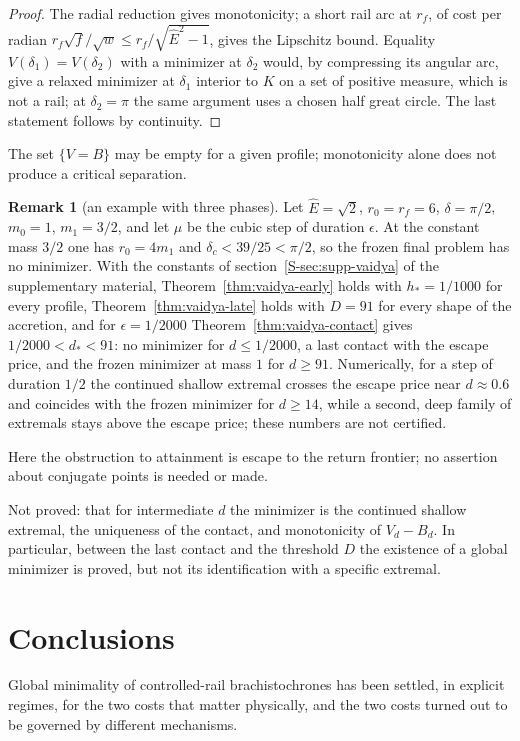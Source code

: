 \documentclass[aip,jmp,amsmath,amssymb,reprint]{revtex4-2}
\newcommand{\Ehat}{\hat E}
\theoremstyle{plain}
\theoremstyle{definition}
\newtheorem{remark}[proposition]{Remark}
\begin{document}
\begin{proof}
The radial reduction gives monotonicity; a short rail arc at $r_f$, of cost per radian
$r_f\sqrt f/\sqrt w\le r_f/\sqrt{\Ehat^2-1}$, gives the Lipschitz bound. Equality $V(\delta_1)=V(\delta_2)$ with a
minimizer at $\delta_2$ would, by compressing its angular arc, give a relaxed minimizer at $\delta_1$ interior to
$K$ on a set of positive measure, which is not a rail; at $\delta_2=\pi$ the same argument uses a chosen half
great circle. The last statement follows by continuity.
\end{proof}

The set $\{V=B\}$ may be empty for a given profile; monotonicity alone does not produce a critical
separation.

\begin{remark}[an example with three phases]\label{rmk:vaidya-var-example}
Let $\Ehat=\sqrt2$, $r_0=r_f=6$, $\delta=\pi/2$, $m_0=1$, $m_1=3/2$, and let $\mu$ be the cubic step of duration
$\epsilon$. At the constant mass $3/2$ one has $r_0=4m_1$ and $\delta_c<39/25<\pi/2$, so the frozen final problem has no
minimizer. With the constants of section~\ref{S-sec:supp-vaidya} of the supplementary material, Theorem~\ref{thm:vaidya-early} holds with
$h_*=1/1000$ for every profile, Theorem~\ref{thm:vaidya-late} holds with $D=91$ for every shape of the
accretion, and for $\epsilon=1/2000$ Theorem~\ref{thm:vaidya-contact} gives $1/2000<d_*<91$: no minimizer for
$d\le1/2000$, a last contact with the escape price, and the frozen minimizer at mass $1$ for $d\ge91$.
Numerically, for a step of duration $1/2$ the continued shallow extremal crosses the escape price near
$d\approx0.6$ and coincides with the frozen minimizer for $d\ge14$, while a second, deep family of extremals
stays above the escape price; these numbers are not certified.
\end{remark}

Here the obstruction to attainment is escape to the return frontier; no assertion about conjugate
points is needed or made.

Not proved: that for intermediate $d$ the minimizer is the continued shallow extremal, the uniqueness of
the contact, and monotonicity of $V_d-B_d$. In particular, between the last contact and the threshold $D$
the existence of a global minimizer is proved, but not its identification with a specific extremal.


\section{Conclusions}
\label{sec:conclusions}
Global minimality of controlled-rail brachistochrones has been settled, in explicit regimes, for the two
costs that matter physically, and the two costs turned out to be governed by different mechanisms.
\end{document}
